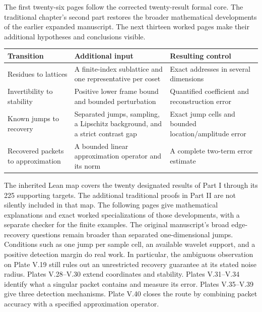 The first twenty-six pages follow the corrected twenty-result formal core. The traditional chapter's second part restores the broader mathematical developments of the earlier expanded manuscript. The next thirteen worked pages make their additional hypotheses and conclusions visible.
\begin{tabularx}{\linewidth}{@{}>{\raggedright\arraybackslash}p{.21\linewidth}YY@{}}\toprule
Transition & Additional input & Resulting control\\\midrule
Residues to lattices & A finite-index sublattice and one representative per coset & Exact addresses in several dimensions\\
Invertibility to stability & Positive lower frame bound and bounded perturbation & Quantified coefficient and reconstruction error\\
Known jumps to recovery & Separated jumps, sampling, a Lipschitz background, and a strict contrast gap & Exact jump cells and bounded location/amplitude error\\
Recovered packets to approximation & A bounded linear approximation operator and its norm & A complete two-term error estimate\\\bottomrule
\end{tabularx}
The inherited Lean map covers the twenty designated results of Part I through its 225 supporting targets. The additional traditional proofs in Part II are not silently included in that map. The following pages give mathematical explanations and exact worked specializations of those developments, with a separate checker for the finite examples.
The original manuscript's broad edge-recovery questions remain broader than separated one-dimensional jumps. Conditions such as one jump per sample cell, an available wavelet support, and a positive detection margin do real work. In particular, the ambiguous observation on Plate V.19 still rules out an unrestricted recovery guarantee at its stated noise radius.
Plates V.28--V.30 extend coordinates and stability. Plates V.31--V.34 identify what a singular packet contains and measure its error. Plates V.35--V.39 give three detection mechanisms. Plate V.40 closes the route by combining packet accuracy with a specified approximation operator.

